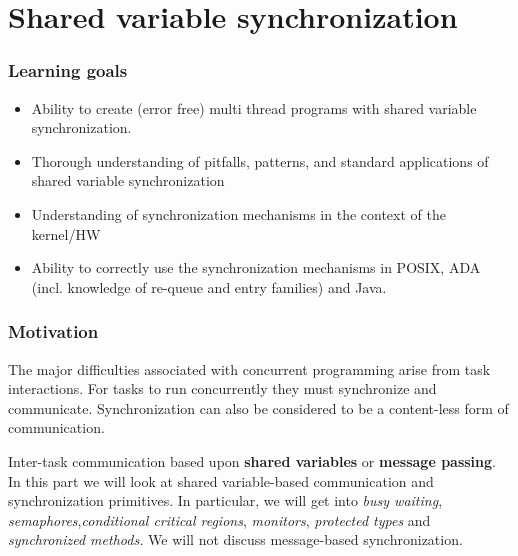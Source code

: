 \part{Shared variable synchronization}
\setcounter{section}{0}
\renewcommand*{\theHsection}{chX.\the\value{section}}
\section{Learning goals}
\begin{itemize}
\item Ability to create (error free) multi thread programs with shared variable synchronization.
\item Thorough understanding of pitfalls, patterns, and standard applications of shared variable synchronization
\item Understanding of synchronization mechanisms in the context of the kernel/HW
\item Ability to correctly use the synchronization mechanisms in POSIX, ADA (incl. knowledge of re-queue and entry families) and Java.

\end{itemize}
\section{Motivation}
The major difficulties associated with concurrent programming arise from task interactions. For tasks to run concurrently they must synchronize and communicate. Synchronization can also be considered to be a content-less form of communication. 

Inter-task communication based upon \textbf{shared variables} or \textbf{message passing}. In this part we will look at shared variable-based communication and synchronization primitives. In particular, we will get into \textit{busy waiting}, \textit{semaphores},\textit{conditional critical regions}, \textit{monitors}, \textit{protected types} and \textit{synchronized methods.} We will not discuss message-based synchronization.

